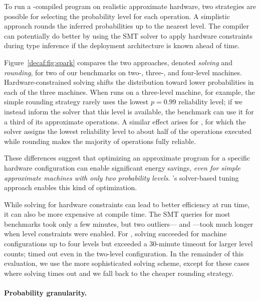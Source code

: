 {To run a \lang-compiled program on realistic approximate hardware, two
strategies are possible for selecting the probability level for each operation.
A simplistic approach rounds the inferred probabilities up to the nearest
level.
The compiler can potentially do better by using the SMT solver to apply hardware
constraints during type inference if the deployment architecture is known
ahead of time.

Figure~\ref{decaf:fig:spark} compares the two approaches, denoted \emph{solving} and
\emph{rounding},
for two of
our benchmarks on \mbox{two-,} \mbox{three-,} and four-level machines.
Hardware-constrained solving shifts the distribution toward lower
probabilities in each of the three machines.
When  runs on a three-level machine, for example, the simple
rounding strategy rarely uses the lowest $p=0.99$ reliability level;
if we instead inform the solver that this level is available, the benchmark
can use it for a third of its approximate operations.
A similar effect arises for , for which the solver assigns the
lowest reliability level to about half of the operations executed while
rounding makes the majority of operations fully reliable.

These differences suggest that optimizing an approximate program for a
specific hardware configuration can enable significant energy savings,
\emph{even for simple approximate machines with only two probability levels}.
\lang's solver-based tuning approach enables this kind of
optimization.

While solving for hardware constraints can lead to better efficiency at run
time, it can also be more expensive at compile time.
The SMT queries for most benchmarks took only a few minutes,
but two outliers--- and ---took much longer when level constraints
were enabled.
For , solving succeeded for machine configurations up to four levels
but exceeded a 30-minute timeout for larger level counts;
 timed out even in the two-level configuration.
In the remainder of this evaluation, we use the more sophisticated solving
scheme, except for these cases where solving times out and we fall back to the
cheaper rounding strategy.


\paragraph{Probability granularity.}

}
